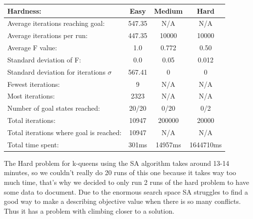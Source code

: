 \documentclass[12pt, a4paper]{article}
\begin{document}
\begin{center}
  \begin{tabular}{| l | c c c|}
    \hline
    Hardness: &\textbf{Easy} & \textbf{Medium} & \textbf{Hard} \\ \hline
    Average iterations reaching goal: & 547.35& N/A & N/A\\
    Average iterations per run:  & 447.35 & 10000 & 10000\\
    Average F value: & 1.0 & 0.772 & 0.50\\
    Standard deviation of F: & 0.0 & 0.05 & 0.012\\
    Standard deviation for iterations $\sigma$ & 567.41 & 0 & 0\\
    Fewest iterations: & 9 & N/A & N/A\\ 
    Most iterations: & 2323 & N/A& N/A\\ 
    Number of goal states reached: & 20/20 & 0/20 & 0/2\\
    Total iterations: & 10947 & 200000 & 20000\\
    Total iterations where goal is reached: & 10947 & N/A& N/A\\
    Total time spent: & 301ms & 14957ms & 1644710ms\\
    \hline
  \end{tabular}
\end{center}
The Hard problem for k-queens using the SA algorithm takes around 13-14 minutes, so we couldn't really do 20 runs of this one because it takes way too much time, that's why we decided to only run 2 runs of the hard problem to have some data to document. Due to the enormous search space SA struggles to find a good way to make a describing objective value when there is so many conflicts. Thus it has a problem with climbing closer to a solution. 
\end{document}
